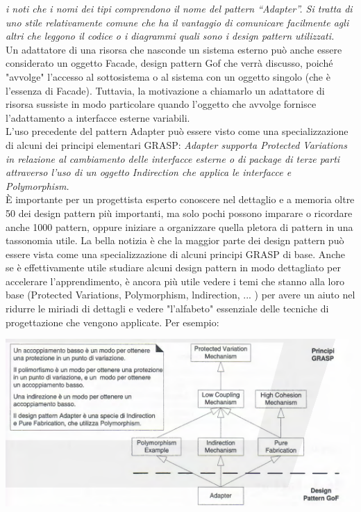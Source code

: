 \documentclass[a4paper,12pt, oneside]{book}
\begin{document}
\textit{i noti che i nomi dei tipi comprendono il nome del pattern ``Adapter''. Si tratta di uno
stile relativamente comune che ha il vantaggio di comunicare facilmente agli altri che
leggono il codice o i diagrammi quali sono i design pattern utilizzati.}\\
Un adattatore di una risorsa che nasconde un sistema esterno può anche essere considerato un oggetto Facade, design pattern Gof che verrà discusso,
poiché
"avvolge" l'accesso al sottosistema o al sistema con un oggetto singolo (che è l'essenza di
Facade). Tuttavia, la motivazione a chiamarlo un adattatore di risorsa sussiste in modo
particolare quando l'oggetto che avvolge fornisce l'adattamento a interfacce esterne variabili.\\
L'uso precedente del pattern Adapter può essere visto come una specializzazione di alcuni
dei principi elementari GRASP:\textit{
Adapter supporta Protected Variations in relazione al cambiamento delle
interfacce esterne o di package di terze parti attraverso l'uso di un oggetto
Indirection che applica le interfacce e Polymorphism.}\\
È importante per un progettista esperto conoscere nel dettaglio e a memoria oltre 50 dei
design pattern più importanti, ma solo pochi possono imparare o ricordare anche 1000
pattern, oppure iniziare a organizzare quella pletora di pattern in una tassonomia utile.
La bella notizia è che la maggior parte dei design pattern può essere vista come una
specializzazione di alcuni principi GRASP di base. Anche se è effettivamente utile studiare alcuni design pattern in modo dettagliato per accelerare l'apprendimento, è ancora
più utile vedere i temi che stanno alla loro base (Protected Variations, Polymorphism,
lndirection, ... ) per avere un aiuto nel ridurre le miriadi di dettagli e vedere "l'alfabeto"
essenziale delle tecniche di progettazione che vengono applicate. Per esempio:
\begin{center}
\includegraphics[scale = 0.7]{img/gof4.png}
\end{center}
\end{document}
